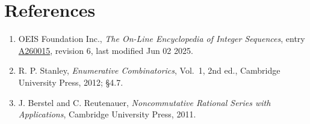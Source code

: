 \documentclass[11pt]{article}
\theoremstyle{definition}
\begin{document}
\section{References}

\begin{enumerate}

\item OEIS Foundation Inc., \emph{The On-Line Encyclopedia of Integer Sequences}, entry \href{https://oeis.org/A260015}{A260015}, revision 6, last modified Jun 02 2025.

\item R. P. Stanley, \emph{Enumerative Combinatorics}, Vol.~1, 2nd ed., Cambridge University Press, 2012; \S4.7.

\item J. Berstel and C. Reutenauer, \emph{Noncommutative Rational Series with Applications}, Cambridge University Press, 2011.

\end{enumerate}
\end{document}
